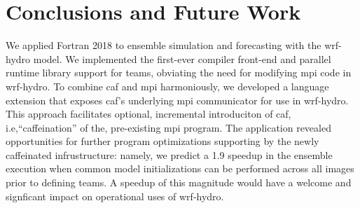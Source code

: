 \section{Conclusions and Future Work}\label{sec:conclusions}
We applied Fortran 2018 to ensemble simulation and forecasting with the \gls{wrf-hydro} model.
We implemented the first-ever compiler front-end and parallel runtime library support
for teams, obviating the need for modifying \gls{mpi} code in \gls{wrf-hydro}.  To combine
\gls{caf} and \gls{mpi} harmoniously, we developed a language extension that exposes \gls{caf}'s
underlying \gls{mpi} communicator for use in \gls{wrf-hydro}.  This approach facilitates
optional, incremental introduciton of \gls{caf}, i.e,``caffeination'' of the,
pre-existing \gls{mpi} program. The application revealed opportunities for further
program optimizations supporting by the newly caffeinated infrustructure:
namely, we predict a 1.9 speedup in the ensemble execution when common model initializations
can be performed across all images prior to defining teams.  A speedup of this magnitude would
have a welcome and signficant impact on operational uses of \gls{wrf-hydro}.




